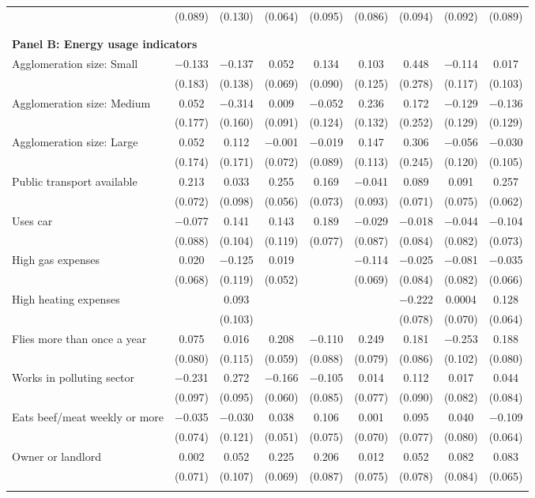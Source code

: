 \begin{tabular}{@{\extracolsep{5pt}}lcccccccc}
  & (0.089) & (0.130) & (0.064) & (0.095) & (0.086) & (0.094) & (0.092) & (0.089) \\ 
 \\[1ex] \hline \\[1ex]
\multicolumn{ 9 }{l}{\textbf{ Panel B: Energy usage indicators }} \\
  Agglomeration size: Small & $-$0.133 & $-$0.137 & 0.052 & 0.134 & 0.103 & 0.448 & $-$0.114 & 0.017 \\ 
  & (0.183) & (0.138) & (0.069) & (0.090) & (0.125) & (0.278) & (0.117) & (0.103) \\ 
  Agglomeration size: Medium & 0.052 & $-$0.314 & 0.009 & $-$0.052 & 0.236 & 0.172 & $-$0.129 & $-$0.136 \\ 
  & (0.177) & (0.160) & (0.091) & (0.124) & (0.132) & (0.252) & (0.129) & (0.129) \\ 
  Agglomeration size: Large & 0.052 & 0.112 & $-$0.001 & $-$0.019 & 0.147 & 0.306 & $-$0.056 & $-$0.030 \\ 
  & (0.174) & (0.171) & (0.072) & (0.089) & (0.113) & (0.245) & (0.120) & (0.105) \\ 
  Public transport available & 0.213 & 0.033 & 0.255 & 0.169 & $-$0.041 & 0.089 & 0.091 & 0.257 \\ 
  & (0.072) & (0.098) & (0.056) & (0.073) & (0.093) & (0.071) & (0.075) & (0.062) \\ 
  Uses car & $-$0.077 & 0.141 & 0.143 & 0.189 & $-$0.029 & $-$0.018 & $-$0.044 & $-$0.104 \\ 
  & (0.088) & (0.104) & (0.119) & (0.077) & (0.087) & (0.084) & (0.082) & (0.073) \\ 
  High gas expenses & 0.020 & $-$0.125 & 0.019 &  & $-$0.114 & $-$0.025 & $-$0.081 & $-$0.035 \\ 
  & (0.068) & (0.119) & (0.052) &  & (0.069) & (0.084) & (0.082) & (0.066) \\ 
  High heating expenses &  & 0.093 &  &  &  & $-$0.222 & 0.0004 & 0.128 \\ 
  &  & (0.103) &  &  &  & (0.078) & (0.070) & (0.064) \\ 
  Flies more than once a year & 0.075 & 0.016 & 0.208 & $-$0.110 & 0.249 & 0.181 & $-$0.253 & 0.188 \\ 
  & (0.080) & (0.115) & (0.059) & (0.088) & (0.079) & (0.086) & (0.102) & (0.080) \\ 
  Works in polluting sector & $-$0.231 & 0.272 & $-$0.166 & $-$0.105 & 0.014 & 0.112 & 0.017 & 0.044 \\ 
  & (0.097) & (0.095) & (0.060) & (0.085) & (0.077) & (0.090) & (0.082) & (0.084) \\ 
  Eats beef/meat weekly or more & $-$0.035 & $-$0.030 & 0.038 & 0.106 & 0.001 & 0.095 & 0.040 & $-$0.109 \\ 
  & (0.074) & (0.121) & (0.051) & (0.075) & (0.070) & (0.077) & (0.080) & (0.064) \\ 
  Owner or landlord & 0.002 & 0.052 & 0.225 & 0.206 & 0.012 & 0.052 & 0.082 & 0.083 \\ 
  & (0.071) & (0.107) & (0.069) & (0.087) & (0.075) & (0.078) & (0.084) & (0.065) \\ 
 \hline \\[-1.8ex] 


\end{tabular}
